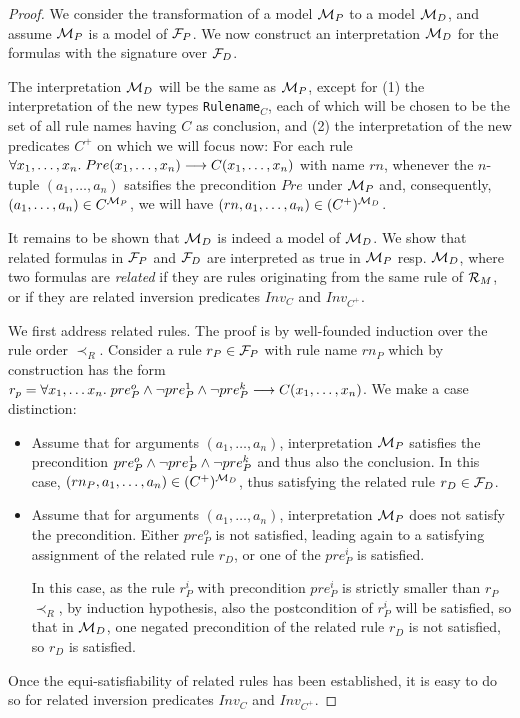 \begin{proof}
  We consider the transformation of a model ${\cal M}_P$ to a model
  ${\cal M}_D$, and assume ${\cal M}_P$ is a model of ${\cal F}_P$. 
  We now construct an interpretation ${\cal M}_D$ for the formulas with the
  signature over ${\cal F}_D$.

  The interpretation ${\cal M}_D$ will be the same as ${\cal M}_P$,
  except for (1) the interpretation of the new types \texttt{Rulename$_C$},
  each of which will be chosen to be the set of all rule names having $C$ as
  conclusion, and (2) the interpretation of the new predicates $C^+$ on which
  we will focus now: 
  For each rule  $\forall x_1, \dots, x_n.\; Pre(x_1,
  \dots, x_n) \longrightarrow C(x_1, \dots, x_n)$ with name  $rn$, whenever the $n$-tuple
  $(a_1, \dots, a_n)$ satsifies the precondition $Pre$ under ${\cal M}_P$ and, consequently,
  $(a_1, \dots, a_n) \in C^{{\cal M}_P}$, we will have   $(rn, a_1, \dots, a_n) \in (C^+)^{{\cal M}_D}$.

  It remains to be shown that ${\cal M}_D$ is indeed a model of ${\cal
    M}_D$. We show that related formulas in ${\cal F}_P$ and ${\cal F}_D$
  are interpreted as true in ${\cal M}_P$ resp.{} ${\cal M}_D$, where two
  formulas are \emph{related} if they are rules originating from the same rule
  of ${\cal R}_M$, or if they are related inversion predicates $Inv_C$ and $Inv_{C^+}$.

  We first address related rules. The proof is by well-founded induction over
  the rule order $\prec_R$. Consider a rule $r_P \in {\cal F}_P$ with rule
  name $rn_P$ which by construction has the form
  $r_p = \forall x_1, \dots x_n.\; pre_P^o \land \lnot pre_P^1 \land \lnot pre_P^k
  \longrightarrow C(x_1, \dots, x_n)$.
  We make a case distinction:
  \begin{itemize}
  \item Assume that for arguments $(a_1, \dots, a_n)$, interpretation
    ${\cal M}_P$ satisfies the precondition
    $pre_P^o \land \lnot pre_P^1 \land \lnot pre_P^k$ and thus also the
    conclusion. In this case, $(rn_P, a_1, \dots, a_n)\in (C^+)^{{\cal M}_D}$, thus
    satisfying the related rule $r_D \in {\cal F}_D$.
  \item Assume that for arguments $(a_1, \dots, a_n)$, interpretation
    ${\cal M}_P$ does not satisfy the precondition. Either $pre_P^o$ is not
    satisfied, leading again to a satisfying assignment of the related rule
    $r_D$, or one of the $pre_P^i$ is satisfied.

    In this case, as the rule $r_P^i$ with precondition $pre_P^i$ is strictly
    smaller than $r_P$ \wrt{} $\prec_R$, by induction hypothesis, also the
    postcondition of $r_P^i$ will be satisfied, so that in ${\cal M}_D$, one
    negated precondition of the related rule $r_D$ is not satisfied, so $r_D$
    is satisfied.
  \end{itemize}

  Once the equi-satisfiability of related rules has been established, it is
  easy to do so for related inversion predicates $Inv_C$ and $Inv_{C^+}$.
\end{proof}


